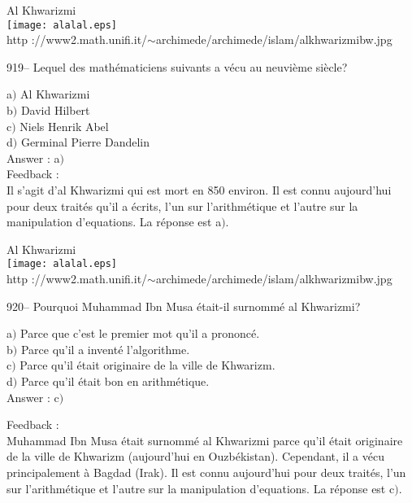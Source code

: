 ﻿\documentclass[letterpaper, 12pt]{article}
\begin{document}
        \begin{center}
        Al Khwarizmi\\
    \texttt{[image: alalal.eps]}\\
        {\footnotesize http
://www2.math.unifi.it/$\sim$archimede/archimede/islam/alkhwarizmibw.jpg}
    \end{center}

919-- Lequel des math\'ematiciens suivants a v\'ecu au neuvi\`eme
si\`ecle?

a$)$ Al Khwarizmi \\
b$)$ David Hilbert \\
c$)$ Niels Henrik Abel \\
d$)$ Germinal Pierre Dandelin\\

Answer : a$)$\\

Feedback :  \\
Il s'agit d'al Khwarizmi qui est mort en 850 environ. Il est connu
aujourd'hui pour deux trait\'es qu'il a \'ecrits,
l'un sur l'arithm\'etique et l'autre sur la manipulation d'equations. La
r\'eponse est a$)$.\\

        \begin{center}
        Al Khwarizmi\\
    \texttt{[image: alalal.eps]}\\
        {\footnotesize http
://www2.math.unifi.it/$\sim$archimede/archimede/islam/alkhwarizmibw.jpg}
    \end{center}

920-- Pourquoi Muhammad Ibn Musa \'etait-il surnomm\'e al Khwarizmi?

a$)$ Parce que c'est le premier mot qu'il a prononc\'e. \\
b$)$ Parce qu'il a invent\'e l'algorithme. \\
c$)$ Parce qu'il \'etait originaire de la ville de Khwarizm. \\
d$)$ Parce qu'il \'etait bon en arithm\'etique.  \\

Answer : c$)$\

Feedback : \\
Muhammad Ibn Musa \'etait surnomm\'e al Khwarizmi parce qu'il
\'etait originaire de la ville de Khwarizm (aujourd'hui en
Ouzb\'ekistan). Cependant, il a v\'ecu principalement \`a Bagdad
(Irak). Il est connu aujourd'hui pour deux trait\'es,
l'un sur l'arithm\'etique et l'autre sur la manipulation d'equations. La
r\'eponse est c$)$.\\
\end{document}
